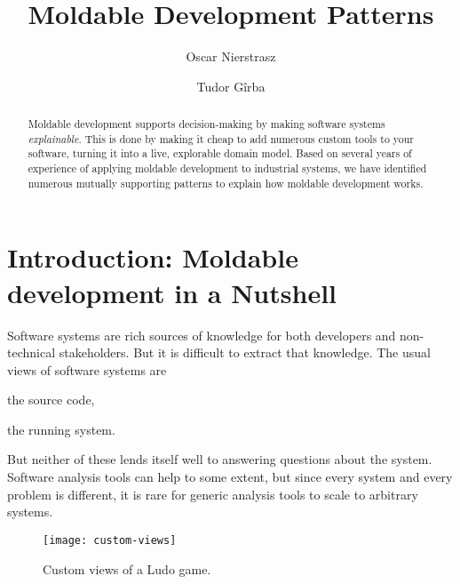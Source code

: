 \documentclass[sigconf]{acmart}
\begin{document}
\title{Moldable Development Patterns}

\author{Oscar Nierstrasz}

\author{Tudor G\^irba}

\renewcommand{\shortauthors}{G\^irba et al.}

\begin{abstract}
Moldable development supports decision-making by making software systems \emph{explainable}.
This is done by making it cheap to add numerous custom tools to your software, turning it into a live, explorable domain model.
Based on several years of experience of applying moldable development to industrial systems, we have identified numerous mutually supporting patterns to explain how moldable development works.
\end{abstract}


\maketitle

\section{Introduction: Moldable development in a Nutshell}


Software systems are rich sources of knowledge for both developers and non-technical stakeholders.
But it is difficult to extract that knowledge.
The usual views of software systems are
\begin{inparaenum}[(i)]
\item the source code,
\item the running system.
\end{inparaenum}
But neither of these lends itself well to answering questions about the system.
Software analysis tools can help to some extent, but since every system and every problem is different, it is rare for generic analysis tools to scale to arbitrary systems.

\begin{figure}[h]
  \texttt{[image: custom-views]}
  \caption{Custom views of a Ludo game.}
  \label{fig:ludo-views}
\end{figure}
\end{document}

